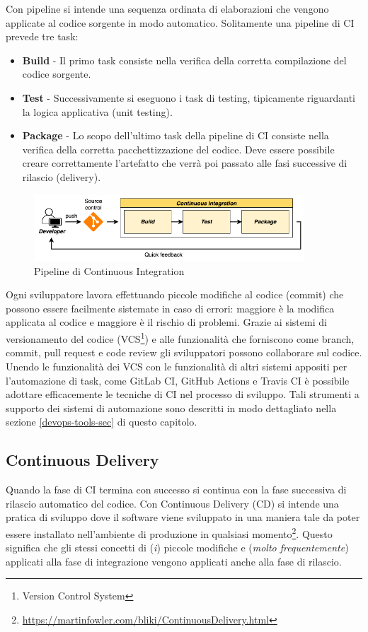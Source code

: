 Con pipeline si intende una sequenza ordinata di elaborazioni che vengono applicate al codice sorgente in modo automatico. Solitamente una pipeline di CI prevede tre task:

\begin{itemize}
    \item \textbf{Build} - Il primo task consiste nella verifica della corretta compilazione del codice sorgente.
    \item \textbf{Test} - Successivamente si eseguono i task di testing, tipicamente riguardanti la logica applicativa (unit testing).
    \item \textbf{Package} - Lo scopo dell'ultimo task della pipeline di CI consiste nella verifica della corretta pacchettizzazione del codice. Deve essere possibile creare correttamente l'artefatto che verrà poi passato alle fasi successive di rilascio (delivery).
\end{itemize}

\begin{figure}[H]
    \centering
    \includegraphics[width=0.9\textwidth]{img/ci-pipeline.png}
    \caption{Pipeline di Continuous Integration}
    \label{ci-pipeline}
\end{figure}

Ogni sviluppatore lavora effettuando piccole modifiche al codice (commit) che possono essere facilmente sistemate in caso di errori: maggiore è la modifica applicata al codice e maggiore è il rischio di problemi. Grazie ai sistemi di versionamento del codice (VCS\footnote{Version Control System}) e alle funzionalità che forniscono come branch, commit, pull request e code review gli sviluppatori possono collaborare sul codice. Unendo le funzionalità dei VCS con le funzionalità di altri sistemi appositi per l'automazione di task, come GitLab CI, GitHub Actions e Travis CI è possibile adottare efficacemente le tecniche di CI nel processo di sviluppo. Tali strumenti a supporto dei sistemi di automazione sono descritti in modo dettagliato nella sezione \ref{devops-tools-sec} di questo capitolo.

\subsection{Continuous Delivery}
\label{cd-sec}
Quando la fase di CI termina con successo si continua con la fase successiva di rilascio automatico del codice. Con Continuous Delivery (CD) si intende una pratica di sviluppo dove il software viene sviluppato in una maniera tale da poter essere installato nell'ambiente di produzione in qualsiasi momento\footnote{\href{https://martinfowler.com/bliki/ContinuousDelivery.html}{https://martinfowler.com/bliki/ContinuousDelivery.html}}. Questo significa che gli stessi concetti di (\textit{i}) piccole modifiche e (\textit{molto frequentemente}) applicati alla fase di integrazione vengono applicati anche alla fase di rilascio.

